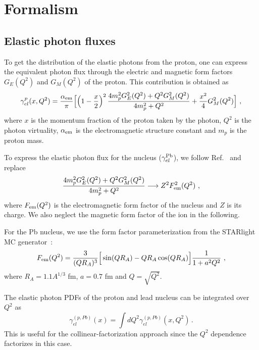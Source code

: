 \section{Formalism}

\subsection{Elastic photon fluxes}


To get the distribution of the elastic photons from the proton, one can express the equivalent photon flux through
the electric and magnetic form factors $G_E(Q^2)$ and $G_M(Q^2)$ of the proton.
This contribution is obtained as
\begin{eqnarray}
   \gamma^{p}_{el}(x,Q^2) = \frac{\alpha_{\rm{em}}}{\pi}
\Big[ \Big( 1- {x \over 2} \Big)^2 \, {4 m_p^2 G_E^2(Q^2) + Q^2 G_M^2(Q^2) \over 4m_p^2 + Q^2} + {x^2 \over 4} G_M^2(Q^2) \Big]~,
\label{proton_el_flux}
\end{eqnarray}
where $x$ is the momentum fraction of the proton taken by the photon, $Q^2$ is the photon virtuality, $\alpha_{\rm{em}}$ is the electromagnetic structure constant and $m_p$ is the proton mass.

To express the elastic photon flux for the nucleus ($\gamma^{\rm Pb}_{el}$), we follow Ref.~\cite{Budnev:1974de} and replace 
\begin{eqnarray}
 {4 m_p^2 G_E^2(Q^2) + Q^2 G_M^2(Q^2) \over 4m_p^2 + Q^2} \longrightarrow Z^2 F_{\rm em}^2(Q^2)~,
 \end{eqnarray}
where $F_{\rm em}(Q^2)$ is the electromagnetic form factor of the nucleus and $Z$ is its charge.
We also neglect the magnetic form factor of the ion in the following.

For the Pb nucleus, we use the form factor parameterization from the STARlight MC generator~\cite{Klein:2016yzr}:
\begin{eqnarray}
 F_{\rm em}(Q^2) = {3 \over (QR_A)^3}\Big[ \sin(QR_A) - QR_A \cos(QR_A) \Big] { 1 \over 1 + a^2 Q^2}~,
 \label{pb_el_flux}
\end{eqnarray}
where $R_A = 1.1 A^{1/3}$ fm, $a = 0.7$ fm and $Q = \sqrt{Q^2}$.

The elastic photon PDFs of the proton and lead nucleus can be integrated over $Q^2$ as 
\begin{equation}
\gamma^{(p,Pb)}_{el}(x)  = \int d Q^2 \gamma^{(p,Pb)}_{el}(x, Q^2) \,.
\end{equation}
This is useful for the collinear-factorization approach since the $Q^2$ dependence factorizes in this case. 
